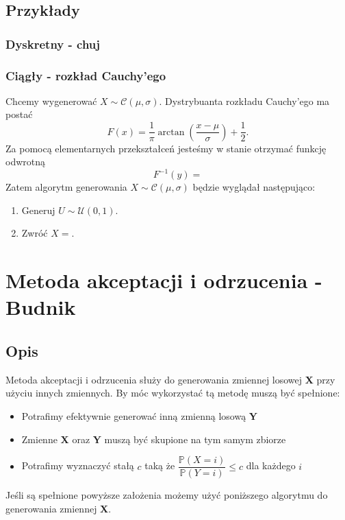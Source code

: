 \documentclass[12pt]{mwrep}
\begin{document}
	\subsection{Przykłady}
	\subsubsection{Dyskretny - chuj}
	\subsubsection{Ciągły - rozkład Cauchy'ego}
	\noindent Chcemy wygenerować $ X \sim \mathcal{C}(\mu, \sigma) $. 
	Dystrybuanta rozkładu Cauchy'ego ma postać
	$$ F(x) = \frac{1}{\pi} \arctan{\left(\frac{x - \mu}{\sigma}\right)} + \frac{1}{2}. $$
	Za pomocą elementarnych przekształceń jesteśmy w stanie otrzymać funkcję odwrotną
	$$ F^{-1}(y) = $$
	Zatem algorytm generowania $ X \sim \mathcal{C}(\mu, \sigma) $ będzie wyglądał następująco:
	\begin{enumerate}
		\item Generuj $U \sim \mathcal{U}(0, 1)$.
		\item Zwróć $ X = $.
	\end{enumerate}



	
	\section{Metoda akceptacji i odrzucenia\textsuperscript{\cite{A-O}} - Budnik}
	\subsection{Opis}
	Metoda akceptacji i odrzucenia służy do generowania zmiennej losowej \textbf{X} przy użyciu innych zmiennych. By móc wykorzystać tą metodę muszą być spełnione:
	\begin{itemize}[leftmargin=10mm]
		\item Potrafimy efektywnie generować inną zmienną losową \textbf{Y}
		\item Zmienne \textbf{X} oraz \textbf{Y} muszą być skupione na tym samym zbiorze
		\item Potrafimy wyznaczyć stałą $c$ taką że $\dfrac{\mathbb{P}(X=i)}{\mathbb{P}(Y=i)}\leqslant c$ dla każdego $i$
	\end{itemize}
	Jeśli są spełnione powyższe założenia możemy użyć poniższego algorytmu do generowania zmiennej \textbf{X}.
\end{document}
